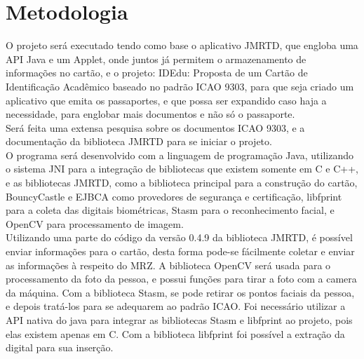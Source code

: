 \documentclass{article}
\begin{document}
	\section{Metodologia}
		\begin{flushleft}
			
		\hspace{2cm}O projeto será executado tendo como base o aplicativo JMRTD\cite{JMRTD}, que engloba uma API Java e um Applet, onde juntos já permitem o armazenamento de informações no cartão, e o projeto: IDEdu: Proposta de um Cartão de Identificação Acadêmico\cite{SASSO} baseado no padrão ICAO 9303\cite{ICAO}, para que seja criado um aplicativo que emita os passaportes, e que possa ser expandido caso haja a necessidade, para englobar mais documentos e não só o passaporte.\\
		\hspace{2cm}Será feita uma extensa pesquisa sobre os documentos ICAO 9303\cite{ICAO}, e a documentação da biblioteca JMRTD para se iniciar o projeto.\\
		\hspace{2cm}O programa será desenvolvido com a linguagem de programação Java, utilizando o sistema JNI para a integração de bibliotecas que existem somente em C e C++, e as bibliotecas JMRTD, como a biblioteca principal para a construção do cartão, BouncyCastle\cite{BOUNCYCASTLE} e EJBCA\cite{EJBCA} como provedores de segurança e certificação, libfprint\cite{PRINT} para a coleta das digitais biométricas, Stasm\cite{STASM} para o reconhecimento facial, e OpenCV\cite{OPENCV} para processamento de imagem.\\
		\hspace{2cm}Utilizando uma parte do código da versão 0.4.9 da biblioteca JMRTD, é possível enviar informações para o cartão, desta forma pode-se fácilmente coletar e enviar as informações à respeito do MRZ. A biblioteca OpenCV será usada para o processamento da foto da pessoa, e possui funções para tirar a foto com a camera da máquina. Com a biblioteca Stasm, se pode retirar os pontos faciais da pessoa, e depois tratá-los para se adequarem ao padrão ICAO. Foi necessário utilizar a API nativa do java para integrar as bibliotecas Stasm e libfprint ao projeto, pois elas existem apenas em C. Com a biblioteca libfprint foi possível a extração da digital para sua inserção.

		\end{flushleft}
\end{document}

